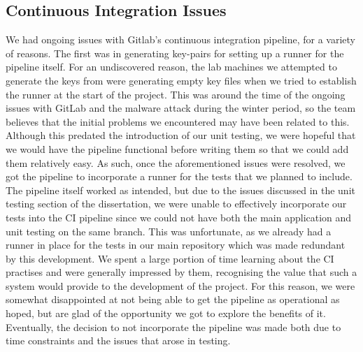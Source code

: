 \documentclass{l3proj}
\begin{document}
\subsection{Continuous Integration Issues}
\label{subsec: continuous integration issues}
We had ongoing issues with Gitlab's continuous integration pipeline, for a variety of reasons. The first was in generating key-pairs for setting up a runner for the pipeline itself. For an undiscovered reason, the lab machines we attempted to generate the keys from were generating empty key files when we tried to establish the runner at the start of the project. This was around the time of the ongoing issues with GitLab and the malware attack during the winter period, so the team believes that the initial problems we encountered may have been related to this. Although this predated the introduction of our unit testing, we were hopeful that we would have the pipeline functional before writing them so that we could add them relatively easy. As such, once the aforementioned issues were resolved, we got the pipeline to incorporate a runner for the tests that we planned to include. The pipeline itself worked as intended, but due to the issues discussed in the unit testing section of the dissertation, we were unable to effectively incorporate our tests into the CI pipeline since we could not have both the main application and unit testing on the same branch. This was unfortunate, as we already had a runner in place for the tests in our main repository which was made redundant by this development. We spent a large portion of time learning about the CI practises and were generally impressed by them, recognising the value that such a system would provide to the development of the project. For this reason, we were somewhat disappointed at not being able to get the pipeline as operational as hoped, but are glad of the opportunity we got to explore the benefits of it. Eventually, the decision to not incorporate the pipeline was made both due to time constraints and the issues that arose in testing.\par
\end{document}
